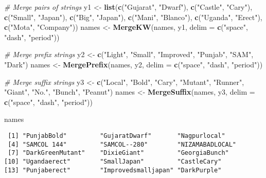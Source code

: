 \documentclass[]{article}
\newenvironment{Shaded}{\begin{snugshade}}{\end{snugshade}}
\newcommand{\CommentTok}[1]{\textcolor[rgb]{0.56,0.35,0.01}{\textit{#1}}}
\newcommand{\DataTypeTok}[1]{\textcolor[rgb]{0.13,0.29,0.53}{#1}}
\newcommand{\KeywordTok}[1]{\textcolor[rgb]{0.13,0.29,0.53}{\textbf{#1}}}
\newcommand{\NormalTok}[1]{#1}
\newcommand{\StringTok}[1]{\textcolor[rgb]{0.31,0.60,0.02}{#1}}
\begin{document}
\begin{Shaded}
\begin{Highlighting}[]
\CommentTok{# Merge pairs of strings}
\NormalTok{y1 <-}\StringTok{ }\KeywordTok{list}\NormalTok{(}\KeywordTok{c}\NormalTok{(}\StringTok{"Gujarat"}\NormalTok{, }\StringTok{"Dwarf"}\NormalTok{), }\KeywordTok{c}\NormalTok{(}\StringTok{"Castle"}\NormalTok{, }\StringTok{"Cary"}\NormalTok{), }\KeywordTok{c}\NormalTok{(}\StringTok{"Small"}\NormalTok{, }\StringTok{"Japan"}\NormalTok{),}
           \KeywordTok{c}\NormalTok{(}\StringTok{"Big"}\NormalTok{, }\StringTok{"Japan"}\NormalTok{), }\KeywordTok{c}\NormalTok{(}\StringTok{"Mani"}\NormalTok{, }\StringTok{"Blanco"}\NormalTok{), }\KeywordTok{c}\NormalTok{(}\StringTok{"Uganda"}\NormalTok{, }\StringTok{"Erect"}\NormalTok{),}
           \KeywordTok{c}\NormalTok{(}\StringTok{"Mota"}\NormalTok{, }\StringTok{"Company"}\NormalTok{))}
\NormalTok{names <-}\StringTok{ }\KeywordTok{MergeKW}\NormalTok{(names, y1, }\DataTypeTok{delim =} \KeywordTok{c}\NormalTok{(}\StringTok{"space"}\NormalTok{, }\StringTok{"dash"}\NormalTok{, }\StringTok{"period"}\NormalTok{))}

\CommentTok{# Merge prefix strings}
\NormalTok{y2 <-}\StringTok{ }\KeywordTok{c}\NormalTok{(}\StringTok{"Light"}\NormalTok{, }\StringTok{"Small"}\NormalTok{, }\StringTok{"Improved"}\NormalTok{, }\StringTok{"Punjab"}\NormalTok{, }\StringTok{"SAM"}\NormalTok{, }\StringTok{"Dark"}\NormalTok{)}
\NormalTok{names <-}\StringTok{ }\KeywordTok{MergePrefix}\NormalTok{(names, y2, }\DataTypeTok{delim =} \KeywordTok{c}\NormalTok{(}\StringTok{"space"}\NormalTok{, }\StringTok{"dash"}\NormalTok{, }\StringTok{"period"}\NormalTok{))}

\CommentTok{# Merge suffix strings}
\NormalTok{y3 <-}\StringTok{ }\KeywordTok{c}\NormalTok{(}\StringTok{"Local"}\NormalTok{, }\StringTok{"Bold"}\NormalTok{, }\StringTok{"Cary"}\NormalTok{, }\StringTok{"Mutant"}\NormalTok{, }\StringTok{"Runner"}\NormalTok{, }\StringTok{"Giant"}\NormalTok{, }\StringTok{"No."}\NormalTok{,}
        \StringTok{"Bunch"}\NormalTok{, }\StringTok{"Peanut"}\NormalTok{)}
\NormalTok{names <-}\StringTok{ }\KeywordTok{MergeSuffix}\NormalTok{(names, y3, }\DataTypeTok{delim =} \KeywordTok{c}\NormalTok{(}\StringTok{"space"}\NormalTok{, }\StringTok{"dash"}\NormalTok{, }\StringTok{"period"}\NormalTok{))}

\NormalTok{names}
\end{Highlighting}
\end{Shaded}

\begin{verbatim}
 [1] "PunjabBold"         "GujaratDwarf"       "Nagpurlocal"       
 [4] "SAMCOL 144"         "SAMCOL--280"        "NIZAMABADLOCAL"    
 [7] "DarkGreenMutant"    "DixieGiant"         "GeorgiaBunch"      
[10] "Ugandaerect"        "SmallJapan"         "CastleCary"        
[13] "Punjaberect"        "Improvedsmalljapan" "DarkPurple"        
\end{verbatim}
\end{document}
